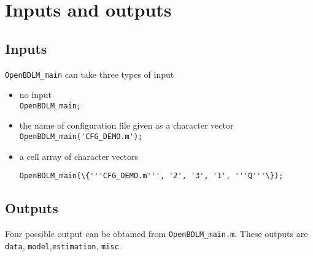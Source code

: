 \section{Inputs and outputs}
\label{S:OpenBDLMINPUTOUTPUT}

\subsection{Inputs}
\label{SS:OpenBDLMinput}
{\lstinline[basicstyle = \mlttfamily \small]!OpenBDLM_main! can take three types of input
\begin{itemize}
  \item no input \\ 
  
  \colorbox{light-gray}{\lstinline[basicstyle = \mlttfamily \small]!OpenBDLM_main;!} \\  
  \item the name of configuration file given as a character vector\\ 
  
    \colorbox{light-gray}{\lstinline[basicstyle = \mlttfamily \small]!OpenBDLM_main('CFG_DEMO.m');!} \\ 
      
  \item a cell array of character vectors\\
  
\raggedright{\colorbox{light-gray}{\lstinline[basicstyle = \mlttfamily \small]!OpenBDLM_main(\{'''CFG_DEMO.m''', '2', '3', '1', '''Q'''\});!}} \\
\end{itemize}

\subsection{Outputs}

 Four possible output can be obtained from \lstinline[basicstyle = \mlttfamily \small]!OpenBDLM_main.m!.
 These outputs are \lstinline[basicstyle = \mlttfamily \small ]!data!, \lstinline[basicstyle = \mlttfamily \small ]!model!,\lstinline[basicstyle = \mlttfamily \small ]!estimation!, \lstinline[basicstyle = \mlttfamily \small ]!misc!.\\
 
}
